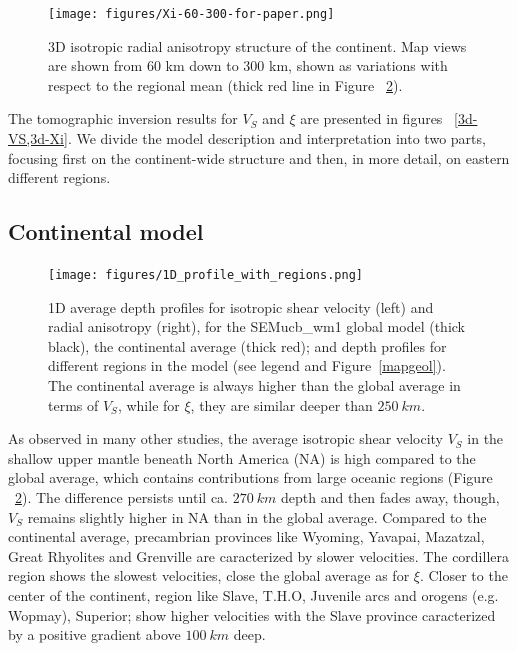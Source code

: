 \documentclass[12pt]{article}
\begin{document}
\begin{figure}[ht]
	\centering
	\texttt{[image: figures/Xi-60-300-for-paper.png]}

	\caption{\baselineskip 18pt
	3D isotropic radial anisotropy structure of the continent. Map views are shown from 60 km down to 300 km, shown as variations with respect to the regional mean (thick red line in Figure ~\ref{1daverage}). 
	}

	\label{3d-Xi}

\end{figure}


The tomographic inversion results for $V_S$ and $\xi$ are presented in figures ~\ref{3d-VS,3d-Xi}. We divide the model description and interpretation into two parts, focusing first on the continent-wide structure and then, in more detail, on eastern different regions.

\subsection{Continental model}
\begin{figure}[ht]
	\centering
	\texttt{[image: figures/1D\_profile\_with\_regions.png]}

	\caption{\baselineskip 18pt 
	1D average depth profiles for isotropic shear velocity (left) and radial anisotropy (right), for the SEMucb\_wm1 global model (thick black), the continental average (thick red); and depth profiles for different regions in the model (see legend and Figure~\ref{mapgeol}). The continental average is always higher than the global average in terms of $V_S$, while for $\xi$, they are similar deeper than $250 \: km$.}
	\label{1daverage}
\end{figure}

As observed in many other studies, the average isotropic shear velocity $V_S$ in the shallow upper mantle beneath North America (NA) is high compared to the global average, which contains contributions from large oceanic regions (Figure ~\ref{1daverage}). 
The difference persists until ca. $270 \: km$ depth and then fades away, though, $V_S$ remains slightly higher in NA than in the global average. 
Compared to the continental average, precambrian provinces like Wyoming, Yavapai, Mazatzal, Great Rhyolites and Grenville are caracterized by slower velocities. 
The cordillera region shows the slowest velocities, close the global average as for $\xi$. 
Closer to the center of the continent, region like Slave, T.H.O, Juvenile arcs and orogens (e.g. Wopmay), Superior; show higher velocities with the Slave province caracterized by a positive gradient above $100 \: km$ deep.
\end{document}
